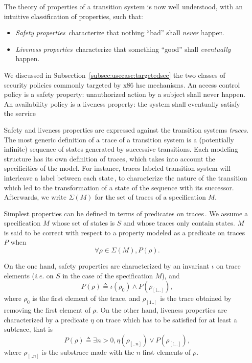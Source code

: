 The theory of properties of a transition system is now well understood, with an
intuitive classification of properties, such that:
%
\begin{itemize}
\item \emph{Safety properties}\,\cite{lamport1977proving,lamport1985logical}
  characterize that nothing ``bad'' shall \emph{never} happen.
\item \emph{Liveness properties}\,\cite{lamport1985logical,alpern1985liveness}
  characterize that something ``good'' shall \emph{eventually} happen.
\end{itemize}

We discussed in Subsection~\ref{subsec:usecase:targetedsec} the two classes of
security policies commonly targeted by x86 \ac{hse} mechanisms.
%
An access control policy is a safety property: unauthorized action by a subject
shall never happen.
%
An availability policy is a liveness property: the system shall eventually
satisfy the service

Safety and liveness properties are expressed against the transition systems
\emph{traces}.
%
The most generic definition of a trace of a transition system is a (potentially
infinite) sequence of states generated by successive transitions.
%
Each modeling structure has its own definition of traces, which takes into
account the specificities of the model.
%
For instance, traces labeled transition system will interleave a label between
each state\,\cite{vijayaraghavan2015modular}, to characterize the nature of the
transition which led to the transformation of a state of the sequence with its
successor.
%
Afterwards, we write \( \Sigma(M) \) for the set of traces of a specification
\( M \).

Simplest properties can be defined in terms of predicates on
traces\,\cite{alpern1987recognizing,schneider2000enforceable,basin2013enforceable}.
%
We assume a specification \( M \) whose set of states is \( S \) and whose
traces only contain states.
%
\( M \) is said to be correct with respect to a property modeled as a predicate
on traces \( P \) when
%
\[
  \forall \rho \in \Sigma(M), P(\rho).
\]

On the one hand, safety properties are characterized by an invariant \( \iota \)
on trace elements (\emph{i.e.} on \( S \) in the case of the specification
\( M \)), and
%
\[
  P(\rho) \triangleq \iota(\rho_0) \wedge P(\rho_{[1..]}),
\]
%
where \( \rho_0 \) is the first element of the trace, and \( \rho_{[1..]} \) is
the trace obtained by removing the first element of \( \rho \).
%
On the other hand, liveness properties are characterized by a predicate
\( \eta \) on trace which has to be satisfied for at least a subtrace, that is
%
\[
  P(\rho) \triangleq \exists n > 0, \eta(\rho_{[..n]}) \vee P(\rho_{[1..]}),
\]
%
where \( \rho_{[..n]} \) is the substrace made with the \( n \) first elements
of \( \rho \).

